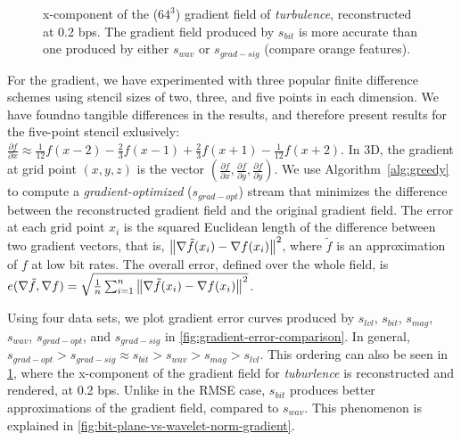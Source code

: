 \begin{figure}[h]
	\centering
	\caption{x-component of the ($64^3$) gradient field of \emph{turbulence}, reconstructed at 0.2
	bps. The gradient field produced by $s_{bit}$ is more accurate than one produced by either
	$s_{wav}$ or $s_{grad-sig}$ (compare orange features).}\label{fig:gradient-rendering-diff}
\end{figure}

For the gradient, we have experimented with three popular finite difference schemes using stencil
sizes of two, three, and five points in each dimension. We have foundno tangible differences in the
results, and therefore present results for the five-point stencil exlusively: $\frac{\partial
f}{\partial x}\approx \frac{1}{12}f(x-2)-\frac{2}{3}f(x-1)+\frac{2}{3}f(x+1)-\frac{1}{12}f(x+2)$. In
3D, the gradient at grid point $(x,y,z)$ is the vector $(\frac{\partial f}{\partial
x},\frac{\partial f}{\partial y}, \frac{\partial f}{\partial y})$. We use Algorithm~\ref{alg:greedy}
to compute a \emph{gradient-optimized} ($s_{grad-opt}$) stream that minimizes the difference between
the reconstructed gradient field and the original gradient field. The error at each grid point $x_i$
is the squared Euclidean length of the difference between two gradient vectors, that is,
$\left\lVert\nabla \tilde{f}(x_i)-\nabla f(x_i)\right\rVert^2$, where $\tilde{f}$ is an approximation of $f$
at low bit rates. The overall error, defined over the whole field, is $e(\nabla \tilde{f},\nabla
f)=\sqrt{\frac{1}{n}\sum_{i=1}^{n}{\left\lVert\nabla \tilde{f}(x_i)-\nabla f(x_i)\right\rVert^2}}$.

Using four data sets, we plot gradient error curves produced by $s_{lvl}$, $s_{bit}$, $s_{mag}$,
$s_{wav}$, $s_{grad-opt}$, and $s_{grad-sig}$ in \cref{fig:gradient-error-comparison}. In
general, $s_{grad-opt} > s_{grad-sig} \approx s_{bit} > s_{wav} > s_{mag} > s_{lvl}$. This ordering
can also be seen in \cref{fig:gradient-rendering-diff}, where the x-component of the gradient
field for \emph{tuburlence} is reconstructed and rendered, at 0.2 bps. Unlike in the RMSE case,
$s_{bit}$ produces better approximations of the gradient field, compared to $s_{wav}$. This
phenomenon is explained in \cref{fig:bit-plane-vs-wavelet-norm-gradient}.


